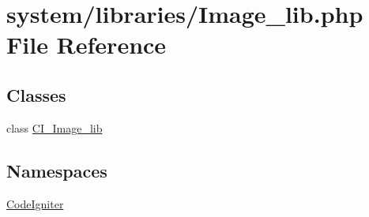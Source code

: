 \hypertarget{_image__lib_8php}{}\section{system/libraries/\+Image\+\_\+lib.php File Reference}
\label{_image__lib_8php}
\subsection*{Classes}
\begin{DoxyCompactItemize}
\item 
class \mbox{\hyperlink{class_c_i___image__lib}{C\+I\+\_\+\+Image\+\_\+lib}}
\end{DoxyCompactItemize}
\subsection*{Namespaces}
\begin{DoxyCompactItemize}
\item 
 \mbox{\hyperlink{namespace_code_igniter}{Code\+Igniter}}
\end{DoxyCompactItemize}
